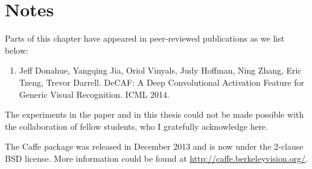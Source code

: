 

\section*{Notes}
Parts of this chapter have appeared in peer-reviewed publications as we list below:
\begin{enumerate}
\item Jeff Donahue, Yangqing Jia, Oriol Vinyals, Judy Hoffman, Ning Zhang, Eric Tzeng, Trevor Darrell. DeCAF: A Deep Convolutional Activation Feature for Generic Visual Recognition. ICML 2014.
\end{enumerate}
The experiments in the paper and in this thesis could not be made possible with the collaboration of fellow students, who I gratefully acknowledge here.

The Caffe package was released in December 2013 and is now under the 2-clause BSD license. More information could be found at \url{http://caffe.berkeleyvision.org/}.